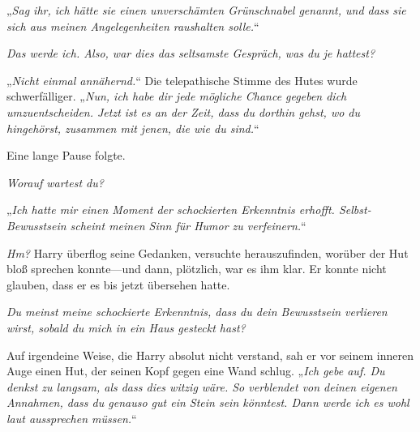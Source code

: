 „\emph{Sag ihr, ich hätte sie einen unverschämten Grünschnabel genannt, und dass sie sich aus meinen Angelegenheiten raushalten solle.}“

\emph{Das werde ich. Also, war dies das seltsamste Gespräch, was du je hattest? }

„\emph{Nicht einmal annähernd.}“ Die telepathische Stimme des Hutes wurde schwerfälliger. „\emph{Nun, ich habe dir jede mögliche Chance gegeben dich umzuentscheiden. Jetzt ist es an der Zeit, dass du dorthin gehst, wo du hingehörst, zusammen mit jenen, die wie du sind.}“

Eine lange Pause folgte.

\emph{Worauf wartest du? }

„\emph{Ich hatte mir einen Moment der schockierten Erkenntnis erhofft. Selbst-Bewusstsein scheint meinen Sinn für Humor zu verfeinern.}“

\emph{Hm?} Harry überflog seine Gedanken, versuchte herauszufinden, worüber der Hut bloß sprechen konnte—und dann, plötzlich, war es ihm klar. Er konnte nicht glauben, dass er es bis jetzt übersehen hatte.

\emph{Du meinst meine schockierte Erkenntnis, dass du dein Bewusstsein verlieren wirst, sobald du mich in ein Haus gesteckt hast?}

Auf irgendeine Weise, die Harry absolut nicht verstand, sah er vor seinem inneren Auge einen Hut, der seinen Kopf gegen eine Wand schlug. „\emph{Ich gebe auf. Du denkst zu langsam, als dass dies witzig wäre. So verblendet von deinen eigenen Annahmen, dass du genauso gut ein Stein sein könntest. Dann werde ich es wohl laut aussprechen müssen.}“

